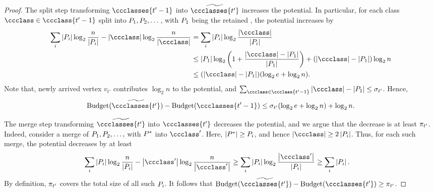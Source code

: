 \begin{proof}
    The split step transforming $ \ccclasses{t'-1} $ into $ \widetilde{\ccclasses{t'}} $ increases the potential. In particular, for each class $ \ccclass \in \ccclass{t'-1} $ split into $ P_{1}, P_{2}, \dots  $, with $ P_{1} $ being the retained \piece{}, the potential increases by
    \begin{align}
        \sum_{i} \card{\pieceToMerge_{i}}\log_{2} \frac{n}{\card{\pieceToMerge_{i}}} - \card{\ccclass}\log_{2} \frac{n}{\card{\ccclass}} &= \sum_{i}\card{\pieceToMerge_{i}} \log_{2}\dfrac{\card{\ccclass}}{\card{\pieceToMerge_{i}}} \nonumber \\
                                                                                                                                                 &\leq \card{\pieceToMerge_{1}}\log_{2}\left(1+\dfrac{\card{\ccclass}-\card{\pieceToMerge_{1}}}{\card{\pieceToMerge_{1}}}\right) + (\card{\ccclass} - \card{\pieceToMerge_{1}})\log_{2}n  \nonumber \\
                                                                                                                                                 &\leq (\card{\ccclass} - \card{\pieceToMerge_{1}})(\log_{2}e + \log_{2}n). \nonumber
    \end{align}
    Note that, newly arrived vertex $ v_{t'} $ contributes $ \log_{2}n $ to the potential, and $ \sum_{\ccclass\in \ccclass{t'-1}}\card{\ccclass} - \card{\pieceToMerge_{1}} \leq \newpiecesize{t'} $.
    Hence,
    \begin{align}
        \potential{\widetilde{\ccclasses{t'}}} - \potential{\ccclasses{t'-1}} \leq \newpiecesize{t'}(\log_{2}e + \log_{2}n) + \log_{2}n. \label{eq.split.increases.potential}
    \end{align}

    The merge step transforming $ \widetilde{\ccclasses{t'}} $ into $ \ccclasses{t'} $ decreases the potential, and we argue that the decrease is at least $ \pi_{t'} $. 
    Indeed, consider a merge of $ P_{1}, P_{2}, \dots, $ with $ P^* $ into $ \ccclass' $. Here, $ \left\lvert P^* \right \rvert \geq P_{i} $, and hence $ \card{\ccclass}\geq 2 \card{\pieceToMerge_{i}} $.
    Thus, for each such merge, the potential decreases by at least
    \begin{align}
        \sum_{i} \card{\pieceToMerge_{i}}\log_{2} \frac{n}{\card{\pieceToMerge_{i}}} - \card{\ccclass'}\log_{2} \frac{n}{\card{\ccclass'}} &\geq \sum_{i}\card{\pieceToMerge_{i}} \log_{2}\dfrac{\card{\ccclass'}}{\card{\pieceToMerge_{i}}} \geq \sum_{i} \card{\pieceToMerge_{i}}. \nonumber
    \end{align}
    By definition, $ \pi_{t'} $ covers the total size of all such $ P_{i} $.
    It follows that $ \potential{\widetilde{\ccclasses{t'}}} - \potential{\ccclasses{t'}} \geq \smallpiecesize{t'} $.


\end{proof}
